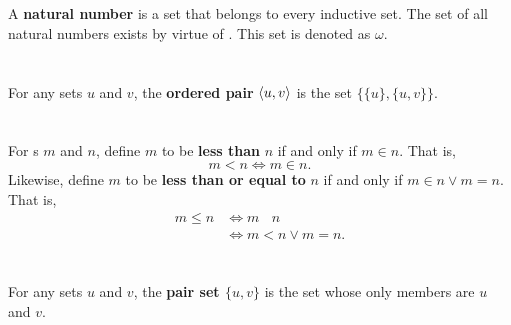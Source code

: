 \documentclass{report}
\newcommand{\ineq}{\,\mathop{\underline{\in}}\,}
\begin{document}

\section{}%

  A \textbf{natural number} is a set that belongs to every inductive set.
  The set of all natural numbers exists by virtue of .
  This set is denoted as $\omega$.


\section{}%

  For any sets $u$ and $v$, the \textbf{ordered pair} $\left< u, v \right>$ is
    the set $\{\{u\}, \{u, v\}\}$.



\section{}%

  For s $m$ and $n$, define $m$ to be
    \textbf{less than} $n$ if and only if $m \in n$.
  That is, $$m < n \iff m \in n.$$
  Likewise, define $m$ to be \textbf{less than or equal to} $n$ if and only if
    $m \in n \lor m = n$.
  That is,
    \begin{align*}
      m \leq n
        & \iff m \ineq n \\
        & \iff m < n \lor m = n.
    \end{align*}


\section{}%

  For any sets $u$ and $v$, the \textbf{pair set $\{u, v\}$} is the set whose
    only members are $u$ and $v$.

\end{document}
